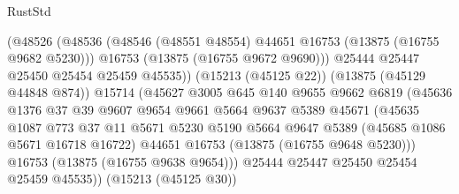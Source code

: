 \begin{lexlean}{RustStd}
\begin{coremodule}
                                (@48526
                                  (@48536
                                    (@48546
                                      (@48551 @48554)
                                      @44651
                                      @16753
                                      (@13875 (@16755 @9682 @5230)))
                                    @16753
                                    (@13875 (@16755 @9672 @9690)))
                                  @25444
                                  @25447
                                  @25450
                                  @25454
                                  @25459
                                  @45535))
                              (@15213 (@45125 @22))
                              (@13875 (@45129 @44848 @874))
                              @15714
                              (@45627
                                @3005
                                @645
                                @140
                                @9655
                                @9662
                                @6819
                                (@45636
                                  @1376
                                  @37
                                  @39
                                  @9607
                                  @9654
                                  @9661
                                  @5664
                                  @9637
                                  @5389
                                  @45671
                                  (@45635
                                    @1087
                                    @773
                                    @37
                                    @11
                                    @5671
                                    @5230
                                    @5190
                                    @5664
                                    @9647
                                    @5389
                                    (@45685 @1086 @5671 @16718 @16722)
                                    @44651
                                    @16753
                                    (@13875 (@16755 @9648 @5230)))
                                  @16753
                                  (@13875 (@16755 @9638 @9654)))
                                @25444
                                @25447
                                @25450
                                @25454
                                @25459
                                @45535))
                            (@15213 (@45125 @30))

\end{coremodule}
\end{lexlean}
